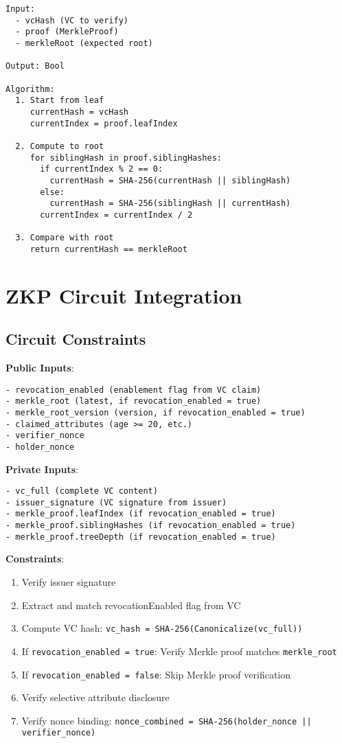 \begin{verbatim}
Input:
  - vcHash (VC to verify)
  - proof (MerkleProof)
  - merkleRoot (expected root)

Output: Bool

Algorithm:
  1. Start from leaf
     currentHash = vcHash
     currentIndex = proof.leafIndex

  2. Compute to root
     for siblingHash in proof.siblingHashes:
       if currentIndex % 2 == 0:
         currentHash = SHA-256(currentHash || siblingHash)
       else:
         currentHash = SHA-256(siblingHash || currentHash)
       currentIndex = currentIndex / 2

  3. Compare with root
     return currentHash == merkleRoot
\end{verbatim}

\section{ZKP Circuit Integration}

\subsection{Circuit Constraints}

\textbf{Public Inputs}:

\begin{verbatim}
- revocation_enabled (enablement flag from VC claim)
- merkle_root (latest, if revocation_enabled = true)
- merkle_root_version (version, if revocation_enabled = true)
- claimed_attributes (age >= 20, etc.)
- verifier_nonce
- holder_nonce
\end{verbatim}

\textbf{Private Inputs}:

\begin{verbatim}
- vc_full (complete VC content)
- issuer_signature (VC signature from issuer)
- merkle_proof.leafIndex (if revocation_enabled = true)
- merkle_proof.siblingHashes (if revocation_enabled = true)
- merkle_proof.treeDepth (if revocation_enabled = true)
\end{verbatim}

\textbf{Constraints}:

\begin{enumerate}
  \item Verify issuer signature
  \item Extract and match revocationEnabled flag from VC
  \item Compute VC hash: \texttt{vc\_hash = SHA-256(Canonicalize(vc\_full))}
  \item If \texttt{revocation\_enabled = true}: Verify Merkle proof matches \texttt{merkle\_root}
  \item If \texttt{revocation\_enabled = false}: Skip Merkle proof verification
  \item Verify selective attribute disclosure
  \item Verify nonce binding: \texttt{nonce\_combined = SHA-256(holder\_nonce || verifier\_nonce)}
\end{enumerate}

